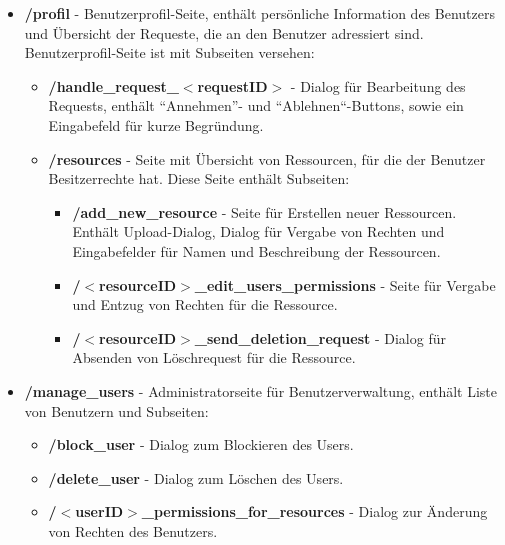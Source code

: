\documentclass[parskip=full,11pt]{scrartcl}
\renewcommand{\labelitemii}{$\circ$}
\begin{document}
\renewcommand{\labelitemi}{$\bullet$}
\renewcommand{\labelitemii}{$\bullet$}
\renewcommand{\labelitemiii}{$\bullet$}
\begin{itemize}[itemsep=0pt]
\item \textbf{/profil} - Benutzerprofil-Seite, enthält persönliche Information des Benutzers und Übersicht der Requeste, die an den Benutzer adressiert sind.\\

Benutzerprofil-Seite ist mit Subseiten versehen:
\begin{itemize}[itemsep=0pt]
\item \textbf{/handle{\_}request{\_}$<$requestID$>$} - Dialog für Bearbeitung des Requests, enthält ``Annehmen''- und ``Ablehnen``-Buttons, sowie ein Eingabefeld für kurze Begründung.
\item \textbf{/resources} - Seite mit Übersicht von Ressourcen, für die der Benutzer Besitzerrechte hat. Diese Seite enthält Subseiten:
\begin{itemize}[itemsep=0pt]
\item \textbf{/add{\_}new{\_}resource} - Seite für Erstellen neuer Ressourcen. Enthält Upload-Dialog, Dialog für Vergabe von Rechten und Eingabefelder für Namen und Beschreibung der Ressourcen.
\item \textbf{/$<$resourceID$>${\_}edit{\_}users{\_}permissions} - Seite für Vergabe und Entzug von Rechten für die Ressource.
\item \textbf{/$<$resourceID$>${\_}send{\_}deletion{\_}request} - Dialog für Absenden von Löschrequest für die Ressource.
\end{itemize}
\end{itemize}


\item \textbf{/manage{\_}users} - Administratorseite für Benutzerverwaltung, enthält Liste von Benutzern und Subseiten:
\begin{itemize}[itemsep=0pt]
\item \textbf{/block{\_}user} - Dialog zum Blockieren des Users.
\item \textbf{/delete{\_}user} - Dialog zum Löschen des Users.
\item \textbf{/$<$userID$>${\_}permissions{\_}for{\_}resources} - Dialog zur Änderung von Rechten des Benutzers.
\end{itemize}


\end{itemize}
\end{document}
